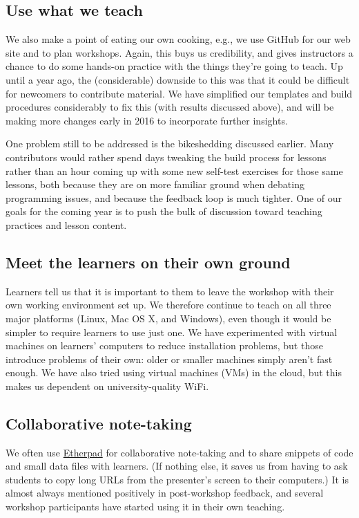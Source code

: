 \documentclass[10pt,a4paper,twocolumn]{article}
\begin{document}
\subsection*{Use what we teach}

We also make a point of eating our own cooking, e.g., we use GitHub
for our web site and to plan workshops. Again, this buys us
credibility, and gives instructors a chance to do some hands-on
practice with the things they're going to teach.  Up until a year ago,
the (considerable) downside to this was that it could be difficult for
newcomers to contribute material.  We have simplified our templates
and build procedures considerably to fix this (with results discussed
above), and will be making more changes early in 2016 to incorporate
further insights.

One problem still to be addressed is the bikeshedding discussed
earlier.  Many contributors would rather spend days tweaking the build
process for lessons rather than an hour coming up with some new
self-test exercises for those same lessons, both because they are on
more familiar ground when debating programming issues, and because the
feedback loop is much tighter.  One of our goals for the coming year
is to push the bulk of discussion toward teaching practices and lesson
content.

\subsection*{Meet the learners on their own ground}

Learners tell us that it is important to them to leave the workshop
with their own working environment set up. We therefore continue to
teach on all three major platforms (Linux, Mac OS X, and Windows),
even though it would be simpler to require learners to use just
one. We have experimented with virtual machines on learners' computers
to reduce installation problems, but those introduce problems of their
own: older or smaller machines simply aren't fast enough.  We have
also tried using virtual machines (VMs) in the cloud, but this makes
us dependent on university-quality WiFi.

\subsection*{Collaborative note-taking}

We often use \href{http://etherpad.org}{Etherpad} for collaborative
note-taking and to share snippets of code and small data files with
learners. (If nothing else, it saves us from having to ask students to
copy long URLs from the presenter's screen to their computers.) It is
almost always mentioned positively in post-workshop feedback, and
several workshop participants have started using it in their own
teaching.
\end{document}
